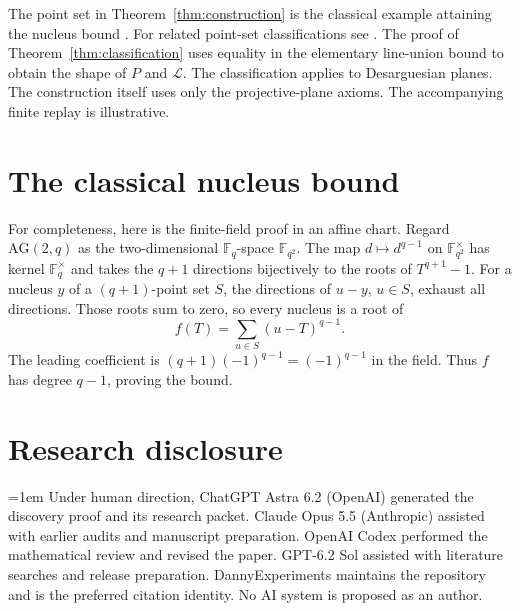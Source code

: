 \documentclass[11pt,a4paper]{amsart}
\newcommand{\AG}{\mathrm{AG}}
\newcommand{\FF}{\mathbb F}
\begin{document}
The point set in Theorem~\ref{thm:construction} is the classical example attaining the nucleus bound \cite{Blokhuis}. For related point-set classifications see \cite{KorchmarosMazzocca}. The proof of Theorem~\ref{thm:classification} uses equality in the elementary line-union bound to obtain the shape of \(P\) and \(\mathcal L\). The classification applies to Desarguesian planes. The construction itself uses only the projective-plane axioms. The accompanying finite replay is illustrative.

\section{The classical nucleus bound}

For completeness, here is the finite-field proof in an affine chart. Regard \(\AG(2,q)\) as the two-dimensional \(\FF_q\)-space \(\FF_{q^2}\). The map \(d\mapsto d^{q-1}\) on \(\FF_{q^2}^{\times}\) has kernel \(\FF_q^{\times}\) and takes the \(q+1\) directions bijectively to the roots of \(T^{q+1}-1\). For a nucleus \(y\) of a \((q+1)\)-point set \(S\), the directions of \(u-y\), \(u\in S\), exhaust all directions. Those roots sum to zero, so every nucleus is a root of
\[
f(T)=\sum_{u\in S}(u-T)^{q-1}.
\]
The leading coefficient is \((q+1)(-1)^{q-1}=(-1)^{q-1}\) in the field. Thus \(f\) has degree \(q-1\), proving the bound.

\section*{Research disclosure}
\begingroup{}\emergencystretch=1em\relax
Under human direction, ChatGPT Astra 6.2 (OpenAI) generated the discovery proof and its research packet. Claude Opus 5.5 (Anthropic) assisted with earlier audits and manuscript preparation. OpenAI Codex performed the mathematical review and revised the paper. GPT-6.2 Sol assisted with literature searches and release preparation. DannyExperiments maintains the repository and is the preferred citation identity. No AI system is proposed as an author.
\par\endgroup
\end{document}
